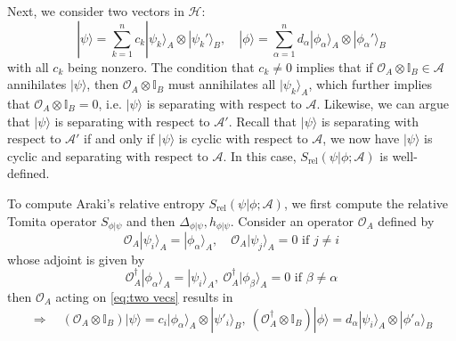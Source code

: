 \documentclass[a4paper,11pt]{article}
\newcommand{\ket}[1]{| #1 \rangle } %
\renewcommand{\=}[1]{\stackrel{#1}{=}} %
\def\A{\mathcal{A}}
\def\O{\mathcal{O}}
\def\H{\mathcal{H}}
\def\Srel{S_{\text{rel}}}
\begin{document}
Next, we consider two vectors in $\H$:
\begin{equation}\label{eq:two vecs}
	\ket{\psi}=\sum_{k=1}^{n}c_k \ket{\psi_k}_A\otimes\ket{\psi_k'}_B,\quad \ket{\phi}=\sum_{\alpha=1}^{n}d_\alpha \ket{\phi_\alpha}_A\otimes\ket{\phi_\alpha'}_B
\end{equation}
with all $c_k$ being nonzero. The condition that $c_k\neq 0$ implies that if $\O_A \otimes \mathbb{I}_B\in \A$ annihilates $\ket{\psi}$, then $\O_A \otimes \mathbb{I}_B$ must annihilates all $\ket{\psi_k}_A$, which further implies that $\O_A \otimes \mathbb{I}_B=0$, i.e. $\ket{\psi}$ is separating with respect to $\A$. Likewise, we can argue that $\ket{\psi}$ is separating with respect to $\A'$. Recall that $\ket{\psi}$ is separating with respect to $\A'$ if and only if $\ket{\psi}$ is cyclic with respect to $\A$, we now have $\ket{\psi}$ is cyclic and separating with respect to $\A$. In this case, $\Srel(\psi|\phi;\A)$ is well-defined.





To compute Araki's relative entropy $\Srel(\psi|\phi;\A)$, we first compute the relative Tomita operator $S_{\phi|\psi}$ and then $\Delta_{\phi|\psi},h_{\phi|\psi}$. Consider an operator $\O_A$ defined by
\begin{equation}
	\O_A\ket{\psi_i}_A=\ket{\phi_\alpha}_A,\quad \O_A\ket{\psi_j}_A=0\text{ if }j\neq i
\end{equation}
whose adjoint is given by
\begin{equation}
	\O_A^\dagger\ket{\phi_\alpha}_A=\ket{\psi_i}_A,~ \O_A^\dagger\ket{\phi_\beta}_A=0\text{ if }\beta\neq \alpha
\end{equation}
then $\O_A$ acting on \eqref{eq:two vecs} results in
\begin{equation}
	\Rightarrow\quad (\O_A \otimes \mathbb{I}_B)\ket{\psi}=c_i\ket{\phi_\alpha}_A\otimes\ket{\psi'_i}_B,~(\O_A^\dagger \otimes \mathbb{I}_B)\ket{\phi}=d_\alpha\ket{\psi_i}_A\otimes\ket{\phi'_\alpha}_B
\end{equation}
\end{document}
